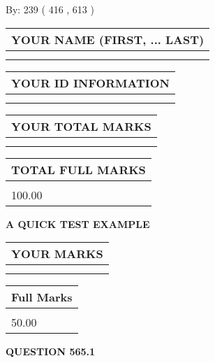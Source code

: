 \documentclass[12pt]{article}
\begin{document}
   
\hspace{1.0in} By: 
 239 ( 416 ,  613 )
   
   
   
   
\newpage 
\setcounter{page}{ 
   565001 } 
   
   
   
   
\noindent\begin{tabular}{|l|}
\hline
YOUR NAME (FIRST, ... LAST)  \\
\hline
 \\ 
 \\ 
\hline
\end{tabular}
\hspace{0.05in} \begin{tabular}{|l|}
\hline
 YOUR   ID   INFORMATION  \\
\hline
 \\ 
 \\ 
\hline
\end{tabular}
   
   
\vspace{0.2in}\noindent\begin{tabular}{|l|}
\hline
YOUR TOTAL MARKS  \\
\hline
 \\ 
 \\ 
\hline
\end{tabular}
\hspace{0.05in} \begin{tabular}{|l|}
\hline
TOTAL FULL MARKS  \\
\hline
 \\ 
100.00 \\
\hline
\end{tabular}
   
   
 \vspace{0.2in}
{\LARGE {\textbf{ A QUICK TEST EXAMPLE}}}
   
   
  
\vspace{0.2in}
  
\noindent\begin{tabular}{|l|}
\hline
 YOUR MARKS  \\
\hline
 \\ 
 \\ 
\hline
\end{tabular}
\hspace{0.05in} \begin{tabular}{|l|}
\hline
 Full Marks  \\
\hline
 \\ 
50.00 \\
\hline
\end{tabular}
{\textbf{\Large{QUESTION
565.1 
}}}
  
\end{document}
